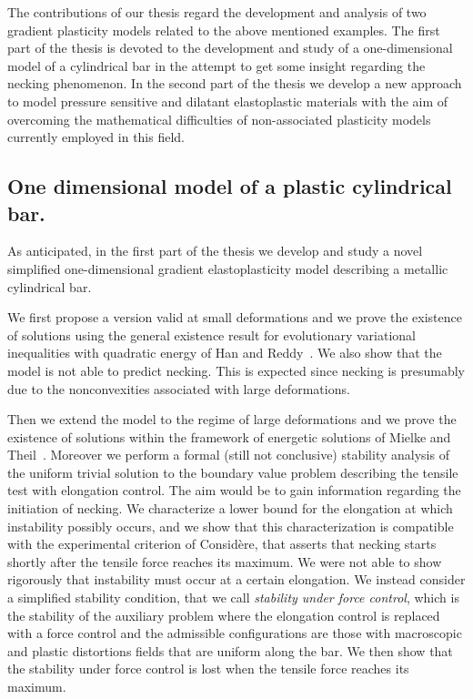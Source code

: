 \documentclass[a4paper,10pt,twoside]{amsbook}
\numberwithin{section}{chapter}
\numberwithin{equation}{chapter}
\theoremstyle{definition}
\begin{document}
The contributions of our thesis regard the development and analysis of two gradient plasticity models related to the above mentioned examples. The first part of the thesis is devoted to the development and study of a one-dimensional model of a cylindrical bar in the attempt to get some insight regarding the necking phenomenon. In the second part of the thesis we develop a new approach to model pressure sensitive and dilatant elastoplastic materials with the aim of overcoming the mathematical difficulties of non-associated plasticity models currently employed in this field.

\subsection*{One dimensional model of a plastic cylindrical bar.}

As anticipated, in the first part of the thesis we develop and study a novel simplified one-dimensional gradient elastoplasticity model describing a metallic cylindrical bar.

We first propose a version valid at small deformations and we prove the existence of solutions using the general existence result for evolutionary variational inequalities with quadratic energy of Han and Reddy~\cite{han-reddy}. We also show that the model is not able to predict necking. This is expected since necking is presumably due to the nonconvexities associated with large deformations.

Then we extend the model to the regime of large deformations and we prove the existence of solutions within the framework of energetic solutions of Mielke and Theil~\cite{francfort,rate-independent-systems}. Moreover we perform a formal (still not conclusive) stability analysis of the uniform trivial solution to the boundary value problem describing the tensile test with elongation control. The aim would be to gain information regarding the initiation of necking. We characterize a lower bound for the elongation at which instability possibly occurs, and we show that this characterization is compatible with the experimental criterion of Considère, that asserts that necking starts shortly after the tensile force reaches its maximum. We were not able to show rigorously that instability must occur at a certain elongation. We instead consider a simplified stability condition, that we call \emph{stability under force control}, which is the stability of the auxiliary problem where the elongation control is replaced with a force control and the admissible configurations are those with macroscopic and plastic distortions fields that are uniform along the bar. We then show that the stability under force control is lost when the tensile force reaches its maximum.
\end{document}
